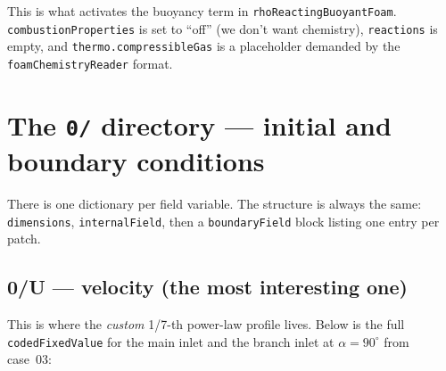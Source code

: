 \documentclass[11pt,a4paper]{article}
\begin{document}
\noindent
This is what activates the buoyancy term in
\texttt{rhoReactingBuoyantFoam}. \texttt{combustionProperties} is set to
``off'' (we don't want chemistry), \texttt{reactions} is empty, and
\texttt{thermo.compressibleGas} is a placeholder demanded by the
\texttt{foamChemistryReader} format.

\clearpage
\section{The \texttt{0/} directory --- initial and boundary conditions}

There is one dictionary per field variable. The structure is always
the same: \texttt{dimensions}, \texttt{internalField}, then a
\texttt{boundaryField} block listing one entry per patch.

\subsection{0/U --- velocity (the most interesting one)}

This is where the \emph{custom} 1/7-th power-law profile lives.
Below is the full \texttt{codedFixedValue} for the main inlet and
the branch inlet at $\alpha=90^\circ$ from case~03:
\end{document}

